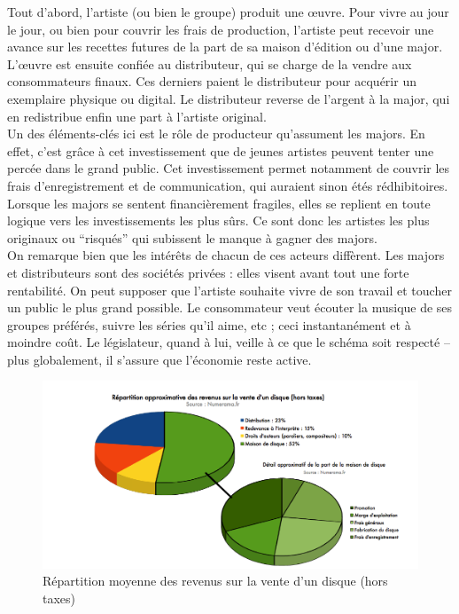 \documentclass[a4paper]{report}
\begin{document}
	Tout d'abord, l'artiste (ou bien le groupe) produit une œuvre. Pour vivre au jour le jour, ou bien pour couvrir les frais de production, l'artiste peut recevoir une avance sur les recettes futures de la part de sa maison d'édition ou d'une major. L'œuvre est ensuite confiée au distributeur, qui se charge de la vendre aux consommateurs finaux. Ces derniers paient le distributeur pour acquérir un exemplaire physique ou digital. Le distributeur reverse de l'argent à la major, qui en redistribue enfin une part à l'artiste original.\\

	Un des éléments-clés ici est le rôle de producteur qu'assument les majors. En effet, c'est grâce à cet investissement que de jeunes artistes peuvent tenter une percée dans le grand public. Cet investissement permet notamment de couvrir les frais d'enregistrement et de communication, qui auraient sinon étés rédhibitoires. Lorsque les majors se sentent financièrement fragiles, elles se replient en toute logique vers les investissements les plus sûrs. Ce sont donc les artistes les plus originaux ou ``risqués'' qui subissent le manque à gagner des majors.\\

	On remarque bien que les intérêts de chacun de ces acteurs diffèrent. Les majors et distributeurs sont des sociétés privées : elles visent avant tout une forte rentabilité. On peut supposer que l'artiste souhaite vivre de son travail et toucher un public le plus grand possible. Le consommateur veut écouter la musique de ses groupes préférés, suivre les séries qu'il aime, etc ; ceci instantanément et à moindre coût. Le législateur, quand à lui, veille à ce que le schéma soit respecté – plus globalement, il s'assure que l'économie reste active.

	\begin{figure}[ht]
		\includegraphics[width=13cm]{images/repartition-des-revenus.png}
		\caption{Répartition moyenne des revenus sur la vente d'un disque (hors taxes)}
	\end{figure}
\end{document}
